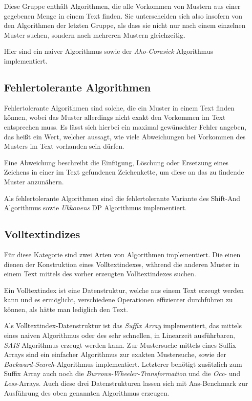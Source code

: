 \documentclass[twocolumn]{article}
\begin{document}
Diese Gruppe enthält Algorithmen, die alle Vorkommen von Mustern aus einer gegebenen Menge in einem Text finden. Sie unterscheiden sich also insofern von den Algorithmen der letzten Gruppe, als dass sie nicht nur nach einem einzelnen Muster suchen, sondern nach mehreren Mustern gleichzeitig.

Hier sind ein naiver Algorithmus sowie der \textit{Aho-Corasick} Algorithmus implementiert.

\subsection{Fehlertolerante Algorithmen}

Fehlertolerante Algorithmen sind solche, die ein Muster in einem Text finden können, wobei das Muster allerdings nicht exakt den Vorkommen im Text entsprechen muss. Es lässt sich hierbei ein maximal gewünschter Fehler angeben, das heißt ein Wert, welcher aussagt, wie viele Abweichungen bei Vorkommen des Musters im Text vorhanden sein dürfen.

Eine Abweichung beschreibt die Einfügung, Löschung oder Ersetzung eines Zeichens in einer im Text gefundenen Zeichenkette, um diese an das zu findende Muster anzunähern.

Als fehlertolerante Algorithmen sind die fehlertolerante Variante des Shift-And Algorithmus sowie \textit{Ukkonens} DP Algorithmus implementiert.

\subsection{Volltextindizes}

Für diese Kategorie sind zwei Arten von Algorithmen implementiert. Die einen dienen der Konstruktion eines Volltextindexes, während die anderen Muster in einem Text mittels des vorher erzeugten Volltextindexes suchen.

Ein Volltextindex ist eine Datenstruktur, welche aus einem Text erzeugt werden kann und es ermöglicht, verschiedene Operationen effizienter durchführen zu können, als hätte man lediglich den Text.

Als Volltextindex-Datenstruktur ist das \textit{Suffix Array} implementiert, das mittels eines naiven Algorithmus oder des sehr schnellen, in Linearzeit ausführbaren, \textit{SAIS}-Algorithmus erzeugt werden kann. Zur Mustersuche mittels eines Suffix Arrays sind ein einfacher Algorithmus zur exakten Mustersuche, sowie der \textit{Backward-Search}-Algorithmus implementiert. Letzterer benötigt zusätzlich zum Suffix Array auch noch die \textit{Burrows-Wheeler-Transformation} und die \textit{Occ}- und \textit{Less}-Arrays. Auch diese drei Datenstrukturen lassen sich mit Aas-Benchmark zur Ausführung des oben genannten Algorithmus erzeugen.
\end{document}
